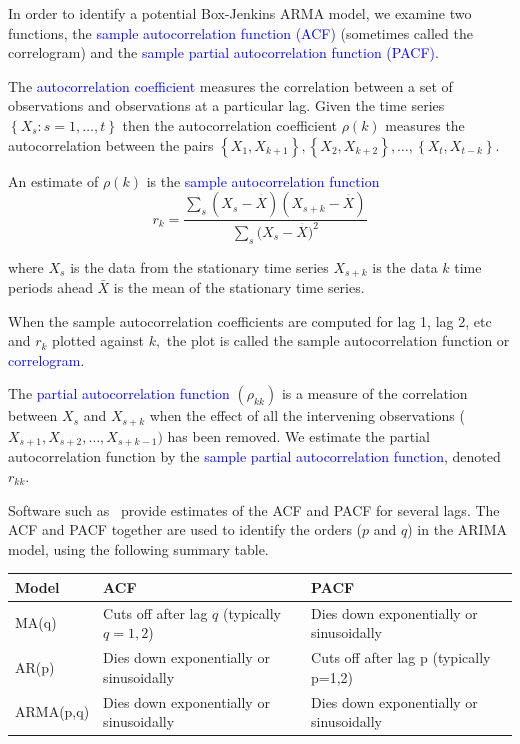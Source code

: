 \documentclass[12pt,a4paper,openany,twoside]{report}
\newcommand{\blue}{\textcolor{blue}}
\newcommand{\emphx}[1]{\blue{#1}}
\theoremstyle{definition}
\theoremstyle{remark}
\theoremstyle{plain}
\newcommand{\vsps}{\vspace{.5cm}}
\newcommand{\sR}[1]{\textbf{R}\,}
\theoremstyle{definition}
\theoremstyle{definition}
\theoremstyle{definition}
\theoremstyle{remark}
\begin{document}
In order to identify a potential Box-Jenkins ARMA model, we examine two
functions, the \emphx{sample autocorrelation function (ACF)} (sometimes
called the correlogram) and the \emphx{sample partial autocorrelation
function (PACF).}

The \emphx{autocorrelation coefficient} measures the correlation
between a set of observations and observations at a particular lag. Given the time
series \(\left\{ X_{s}:s = 1,\ldots,t \right\}\)
then the autocorrelation coefficient \(\rho(k)\) measures the
autocorrelation between the pairs
\(\left\{ X_{1},X_{k + 1} \right\},\left\{ X_{2},X_{k + 2} \right\},\ldots,\left\{ X_{t},X_{t - k} \right\}.\)

An estimate of \(\rho(k)\) is the \emphx{sample autocorrelation function}
\[r_{k} = \frac{\sum_{s}^{}{(X_{s} - \overset{\overline{}}{X})(X_{s + k} - \overset{\overline{}}{X})}}{\sum_{s}^{}{(X_{s} -}\overset{\overline{}}{X})^{2}}\]

where \(X_{s}\) is the data from the stationary time series \(X_{s + k}\) is the data \(k\) time periods ahead \(\bar{X}\) is the mean of the stationary time series.

When the sample autocorrelation coefficients are computed for lag 1, lag
2, etc and \(r_{k}\) plotted against \(k,\) the plot is called the
sample autocorrelation function or \emphx{correlogram}.

The \emphx{partial autocorrelation function} \((\rho_{kk})\) is a measure
of the correlation between \(X_{s}\) and \(X_{s + k}\) when the effect
of all the intervening observations
(\(X_{s + 1},X_{s + 2},\ldots,X_{s + k - 1})\) has been removed. We
estimate the partial autocorrelation function by the \emphx{sample partial
autocorrelation function}, denoted \(r_{kk}\).

Software such as \sR~provide estimates of the ACF
and PACF for several lags. The ACF and PACF together are used to
identify the orders (\(p\) and \(q\)) in the ARIMA model, using the
following summary table.\newline

\begin{longtable}[c]{@{}lll@{}}
\toprule
Model & ACF &
PACF\tabularnewline
\midrule
\endhead
MA(q) & Cuts off after lag $q$ (typically $q=1,2$) & Dies down
exponentially or sinusoidally\tabularnewline
AR(p) & Dies down exponentially or sinusoidally & Cuts off
after lag p (typically p=1,2) \tabularnewline
ARMA(p,q) & Dies down exponentially or sinusoidally & Dies down
exponentially or sinusoidally\tabularnewline
\bottomrule
\end{longtable}
\vsps
\end{document}
